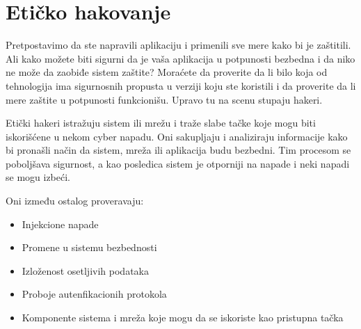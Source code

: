 \documentclass[a4paper]{article}
\begin{document}
{\section{Etičko hakovanje}	
\label{sec:proces}
Pretpostavimo da ste napravili aplikaciju i primenili sve mere kako bi je zaštitili. Ali kako možete biti sigurni da je vaša aplikacija u potpunosti bezbedna i da niko ne može da zaobiđe sistem zaštite? Moraćete da proverite da li bilo koja od tehnologija ima sigurnosnih propusta u verziji koju ste koristili i da proverite da li mere zaštite u potpunosti funkcionišu. Upravo tu na scenu stupaju hakeri.

Etički hakeri istražuju sistem ili mrežu i traže slabe tačke koje mogu biti iskorišćene u nekom cyber napadu. Oni sakupljaju i analiziraju informacije kako bi pronašli način da sistem, mreža ili aplikacija budu bezbedni. Tim procesom se poboljšava sigurnost, a kao posledica sistem je otporniji na napade i neki napadi se mogu izbeći.

Oni između ostalog proveravaju:
\begin{itemize}
\item Injekcione napade
\item Promene u sistemu bezbednosti
\item Izloženost osetljivih podataka
\item Proboje autenfikacionih protokola
\item Komponente sistema i mreža koje mogu da se iskoriste kao pristupna tačka
\end{itemize}  \cite{whatisethacking}

}
\end{document}

